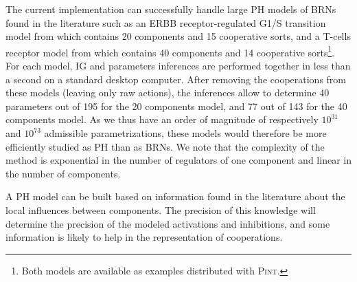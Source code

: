 The current implementation can successfully handle large PH models of BRNs found in the literature
such as an ERBB receptor-regulated G1/S transition model from \cite{Sahin09} which contains 20
components and 15 cooperative sorts, and a T-cells receptor model from \cite{Klamt06} which contains 40
components and 14 cooperative sorts\footnote{Both models are available as examples distributed with \textsc{Pint}.}.
For each model, IG and parameters inferences are performed together in less than a second
on a standard desktop computer.
After removing the cooperations from these models (leaving only raw actions), the inferences allow to
determine 40 parameters out of 195 for the 20 components model, and 77 out of 143 for the 40 components model.
As we thus have an order of magnitude of respectively $10^{31}$ and $10^{73}$ admissible parametrizations,
these models would therefore be more efficiently studied as PH than as BRNs.
We note that the complexity of the method is exponential in the number of regulators of one
component and linear in the number of components.

A PH model can be built based on information found in the literature about the local influences between components.
The precision of this knowledge will determine the precision of the modeled activations and inhibitions,
and some information is likely to help in the representation of cooperations.
